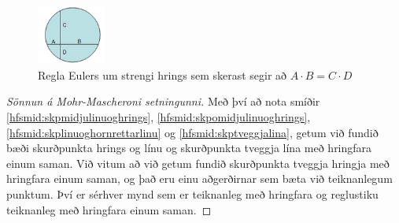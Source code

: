 \begin{frame}
  \begin{figure}[H]
    \centering
    \includegraphics[width=0.2\textwidth]{EulersChords.png}
    \caption{Regla Eulers um strengi hrings sem skerast segir að \(A \cdot B = C \cdot D\) \cite{Chords}}
    \label{fig:eulerschords}
  \end{figure}
\end{frame}




  \begin{frame}
  \begin{proof}[Sönnun á Mohr-Mascheroni setningunni]
    Með því að nota smíðir \ref{hfsmid:skpmidjulinuoghrings},
    \ref{hfsmid:skpomidjulinuoghrings},
    \ref{hfsmid:skplinuoghornrettarlinu} og \ref{hfsmid:skptveggjalina},
    getum við fundið bæði skurðpunkta hrings og
    línu og skurðpunkta tveggja lína með  hringfara einum
    saman. Við vitum að við getum fundið skurðpunkta tveggja hringja
    með hringfara einum saman, og það eru einu aðgerðirnar sem
    bæta við teiknanlegum punktum. Því er sérhver mynd sem
    er teiknanleg með hringfara og reglustiku
    teiknanleg með hringfara einum saman.
  \end{proof}
\end{frame}







